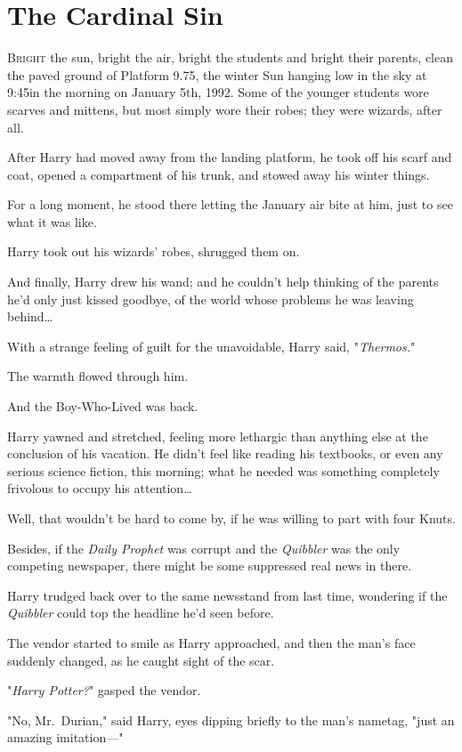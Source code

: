 \chapter{The Cardinal Sin}

\lettrine{B}{right} the sun,
bright the air, bright the students and bright their parents, clean the paved
ground of Platform 9.75, the winter Sun hanging low in the sky at 9:45\AM in the
morning on January 5th, 1992. Some of the younger students wore scarves and
mittens, but most simply wore their robes; they were wizards, after all.

After Harry had moved away from the landing platform, he took off his scarf and
coat, opened a compartment of his trunk, and stowed away his winter things.

For a long moment, he stood there letting the January air bite at him, just to
see what it was like.

Harry took out his wizards' robes, shrugged them on.

And finally, Harry drew his wand; and he couldn't help thinking of the parents
he'd only just kissed goodbye, of the world whose problems he was leaving
behind{\ldots}

With a strange feeling of guilt for the unavoidable, Harry said,
"\emph{Thermos.}"

The warmth flowed through him.

And the Boy-Who-Lived was back.

Harry yawned and stretched, feeling more lethargic than anything else at the
conclusion of his vacation. He didn't feel like reading his textbooks, or even
any serious science fiction, this morning; what he needed was something
completely frivolous to occupy his attention{\ldots}

Well, that wouldn't be hard to come by, if he was willing to part with four
Knuts.

Besides, if the \emph{Daily Prophet} was corrupt and the \emph{Quibbler} was
the only competing newspaper, there might be some suppressed real news in there.

Harry trudged back over to the same newsstand from last time, wondering if the
\emph{Quibbler} could top the headline he'd seen before.

The vendor started to smile as Harry approached, and then the man's face
suddenly changed, as he caught sight of the scar.

"\emph{Harry Potter?}" gasped the vendor.

"No, Mr.~Durian," said Harry, eyes dipping briefly to the man's nametag, "just
an amazing imitation---"

